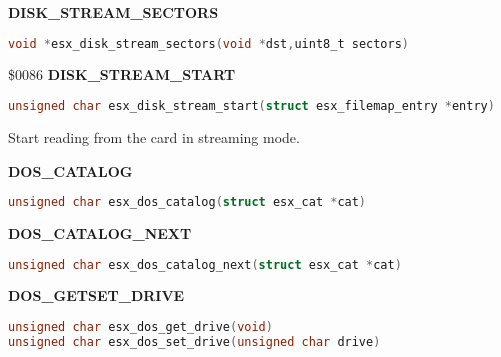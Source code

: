 \textbf{DISK\_STREAM\_SECTORS}

\begin{lstlisting}[language=C]
void *esx_disk_stream_sectors(void *dst,uint8_t sectors)
\end{lstlisting}

\$0086 \textbf{DISK\_STREAM\_START}

\begin{lstlisting}[language=C]
unsigned char esx_disk_stream_start(struct esx_filemap_entry *entry)
\end{lstlisting}

Start reading from the card in streaming mode.

%

\textbf{DOS\_CATALOG}

\begin{lstlisting}[language=C]
unsigned char esx_dos_catalog(struct esx_cat *cat)
\end{lstlisting}

\textbf{DOS\_CATALOG\_NEXT}

\begin{lstlisting}[language=C]
unsigned char esx_dos_catalog_next(struct esx_cat *cat)
\end{lstlisting}

\textbf{DOS\_GETSET\_DRIVE}

\begin{lstlisting}[language=C]
unsigned char esx_dos_get_drive(void)
unsigned char esx_dos_set_drive(unsigned char drive)
\end{lstlisting}

